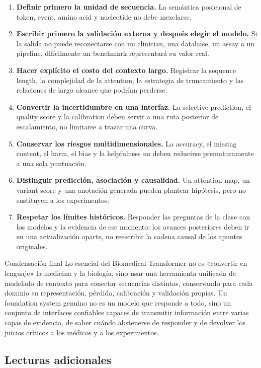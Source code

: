 \begin{enumerate}
  \item \textbf{Definir primero la unidad de secuencia.} La semántica posicional de token, event, amino acid y nucleotide no debe mezclarse.
  \item \textbf{Escribir primero la validación externa y después elegir el modelo.} Si la salida no puede reconectarse con un clinician, una database, un assay o un pipeline, difícilmente un benchmark representará su valor real.
  \item \textbf{Hacer explícito el costo del contexto largo.} Registrar la sequence length, la complejidad de la attention, la estrategia de truncamiento y las relaciones de largo alcance que podrían perderse.
  \item \textbf{Convertir la incertidumbre en una interfaz.} La selective prediction, el quality score y la calibration deben servir a una ruta posterior de escalamiento, no limitarse a trazar una curva.
  \item \textbf{Conservar los riesgos multidimensionales.} La accuracy, el missing content, el harm, el bias y la helpfulness no deben reducirse prematuramente a una sola puntuación.
  \item \textbf{Distinguir predicción, asociación y causalidad.} Un attention map, un variant score y una anotación generada pueden plantear hipótesis, pero no sustituyen a los experimentos.
  \item \textbf{Respetar los límites históricos.} Responder las preguntas de la clase con los modelos y la evidencia de ese momento; los avances posteriores deben ir en una actualización aparte, no reescribir la cadena causal de los apuntes originales.
\end{enumerate}

\begin{importantbox}{Condensación final}
Lo esencial del Biomedical Transformer no es «convertir en lenguaje» la medicina y la biología, sino usar una herramienta unificada de modelado de contexto para conectar secuencias distintas, conservando para cada dominio su representación, pérdida, calibración y validación propias. Un foundation system genuino no es un modelo que responde a todo, sino un conjunto de interfaces confiables capaces de transmitir información entre varias capas de evidencia, de saber cuándo abstenerse de responder y de devolver los juicios críticos a los médicos y a los experimentos.
\end{importantbox}

\subsection{Lecturas adicionales}

